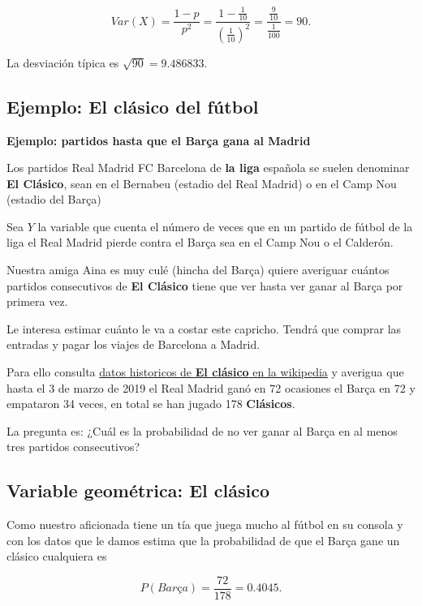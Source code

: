 \documentclass[]{book}
\begin{document}
\[
Var(X)=\frac{1-p}{p^2}=\frac{1-\frac{1}{10}}{\left(\frac{1}{10}\right)^2}=\frac{\frac{9}{10}}{\frac{1}{100}}=
90.
\]

La desviación típica es \(\sqrt{90}=9.486833.\)

\hypertarget{ejemplo-el-cluxe1sico-del-fuxfatbol}{%
\subsection{Ejemplo: El clásico del fútbol}\label{ejemplo-el-cluxe1sico-del-fuxfatbol}}

\textbf{Ejemplo: partidos hasta que el Barça gana al Madrid}

Los partidos Real Madrid FC Barcelona de \textbf{la liga} española se suelen denominar \textbf{El Clásico}, sean en el Bernabeu (estadio del Real Madrid) o en el Camp Nou (estadio del Barça)

Sea \(Y\) la variable que cuenta el número de veces que en un partido de fútbol de la liga el Real Madrid pierde contra el Barça sea en el Camp Nou o el Calderón.

Nuestra amiga Aina es muy culé (hincha del Barça) quiere averiguar cuántos partidos consecutivos de \textbf{El Clásico} tiene que ver hasta ver ganar al Barça por primera vez.

Le interesa estimar cuánto le va a costar este capricho. Tendrá que comprar las entradas y pagar los viajes de Barcelona a Madrid.

Para ello consulta \href{https://es.wikipedia.org/wiki/El_Cl\%C3\%A1sico}{datos historicos de \textbf{El clásico} en la wikipedia} y averigua que hasta el 3 de marzo de 2019 el Real Madrid ganó en 72 ocasiones el Barça en 72 y empataron 34 veces, en total se han jugado 178 \textbf{Clásicos}.

La pregunta es: ¿Cuál es la probabilidad de no ver ganar al Barça en al menos tres partidos consecutivos?

\hypertarget{variable-geomuxe9trica-el-cluxe1sico}{%
\subsection{Variable geométrica: El clásico}\label{variable-geomuxe9trica-el-cluxe1sico}}

Como nuestro aficionada tiene un tía que juega mucho al fútbol en su consola y con los datos que le damos estima que la probabilidad de que el Barça gane un clásico cualquiera es

\[P(Barça)=\frac{72}{178}=0.4045.\]
\end{document}
